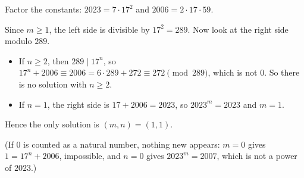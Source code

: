 Factor the constants: $2023=7\cdot17^2$ and $2006=2\cdot17\cdot59$.

Since $m\ge1$, the left side is divisible by $17^2=289$. Now look at the right side modulo $289$.
\begin{itemize}
\item If $n\ge2$, then $289\mid17^n$, so $17^n+2006\equiv2006=6\cdot289+272\equiv272\pmod{289}$, which is not $0$. So there is no solution with $n\ge2$.
\item If $n=1$, the right side is $17+2006=2023$, so $2023^m=2023$ and $m=1$.
\end{itemize}
Hence the only solution is $\boxed{(m,n)=(1,1)}$.

(If $0$ is counted as a natural number, nothing new appears: $m=0$ gives $1=17^n+2006$, impossible, and $n=0$ gives $2023^m=2007$, which is not a power of $2023$.)
